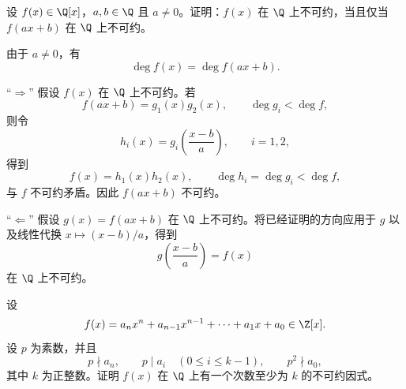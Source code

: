 \begin{problem}
	 设 \(f(x)\in\Q[x]\)，\(a,b\in\Q\) 且 \(a\ne0\)。证明：\(f(x)\) 在 \(\Q\) 上不可约，当且仅当 \(f(ax+b)\) 在 \(\Q\) 上不可约。
\end{problem}

\begin{solution}
	由于 \(a\ne0\)，有
	\[
	\deg f(x)=\deg f(ax+b).
	\]
	
	``\(\Rightarrow\)'' 假设 \(f(x)\) 在 \(\Q\) 上不可约。若
	\[
	f(ax+b)=g_1(x)g_2(x),
	\qquad \deg g_i<\deg f,
	\]
	则令
	\[
	h_i(x)=g_i\left(\frac{x-b}{a}\right),
	\qquad i=1,2,
	\]
	得到
	\[
	f(x)=h_1(x)h_2(x),
	\qquad \deg h_i=\deg g_i<\deg f,
	\]
	与 \(f\) 不可约矛盾。因此 \(f(ax+b)\) 不可约。
	
	``\(\Leftarrow\)'' 假设 \(g(x)=f(ax+b)\) 在 \(\Q\) 上不可约。将已经证明的方向应用于 \(g\) 以及线性代换 \(x\mapsto(x-b)/a\)，得到
	\[
	g\left(\frac{x-b}{a}\right)=f(x)
	\]
	在 \(\Q\) 上不可约。
\end{solution}

\begin{problem}
	 设
	\[
	f(x)=a_nx^n+a_{n-1}x^{n-1}+\cdots+a_1x+a_0\in\Z[x].
	\]
	设 \(p\) 为素数，并且
	\[
	p\nmid a_n,
	\qquad p\mid a_i\quad(0\le i\le k-1),
	\qquad p^2\nmid a_0,
	\]
	其中 \(k\) 为正整数。证明 \(f(x)\) 在 \(\Q\) 上有一个次数至少为 \(k\) 的不可约因式。
\end{problem}

